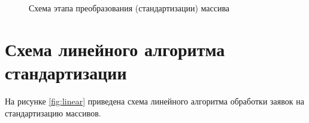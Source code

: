 \newpage
\begin{figure}[h!]
	
	
	\caption{Схема этапа преобразования (стандартизации) массива}
	
	\label{fig:transformer}
	
\end{figure}


\newpage
\section{Схема линейного алгоритма стандартизации}

На рисунке \ref{fig:linear} приведена схема линейного алгоритма обработки заявок на стандартизацию массивов.

